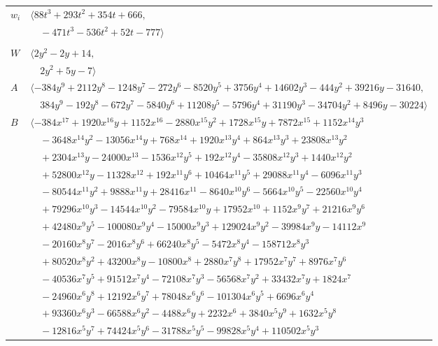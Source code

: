 \documentclass[11pt]{article}
\begin{document}
\begin{longtable}{@{}ll@{}}
$w_i$ & $\langle 88t^{3}+293t^{2}+354t+666,$\\
 & $\quad -471t^{3}-536t^{2}+52t-777\rangle$\\
\addlinespace[2pt]
\multicolumn{2}{@{}p{0.97\textwidth}@{}}{$i=32$, $D_i=2$, $\varphi_i=\tau(\Pi_{42})$, $\rho_{ij}$: $5{:}3, \allowbreak 8{:}3, \allowbreak 17{:}1, \allowbreak 21{:}2, \allowbreak 25{:}3$}\\
$W$ & $\langle 2y^{2}-2y+14,$\\
 & $\quad 2y^{2}+5y-7\rangle$\\
$A$ & $\langle -384y^{9}+2112y^{8}-1248y^{7}-272y^{6}-8520y^{5}+3756y^{4}+14602y^{3}-444y^{2}+39216y-31640,$\\
 & $\quad 384y^{9}-192y^{8}-672y^{7}-5840y^{6}+11208y^{5}-5796y^{4}+31190y^{3}-34704y^{2}+8496y-30224\rangle$\\
$B$ & $\langle -384x^{17}+1920x^{16}y+1152x^{16}-2880x^{15}y^{2}+1728x^{15}y+7872x^{15}+1152x^{14}y^{3}$\\
 & $\quad -3648x^{14}y^{2}-13056x^{14}y+768x^{14}+1920x^{13}y^{4}+864x^{13}y^{3}+23808x^{13}y^{2}$\\
 & $\quad +2304x^{13}y-24000x^{13}-1536x^{12}y^{5}+192x^{12}y^{4}-35808x^{12}y^{3}+1440x^{12}y^{2}$\\
 & $\quad +52800x^{12}y-11328x^{12}+192x^{11}y^{6}+10464x^{11}y^{5}+29088x^{11}y^{4}-6096x^{11}y^{3}$\\
 & $\quad -80544x^{11}y^{2}+9888x^{11}y+28416x^{11}-8640x^{10}y^{6}-5664x^{10}y^{5}-22560x^{10}y^{4}$\\
 & $\quad +79296x^{10}y^{3}-14544x^{10}y^{2}-79584x^{10}y+17952x^{10}+1152x^{9}y^{7}+21216x^{9}y^{6}$\\
 & $\quad +42480x^{9}y^{5}-100080x^{9}y^{4}-15000x^{9}y^{3}+129024x^{9}y^{2}-39984x^{9}y-14112x^{9}$\\
 & $\quad -20160x^{8}y^{7}-2016x^{8}y^{6}+66240x^{8}y^{5}-5472x^{8}y^{4}-158712x^{8}y^{3}$\\
 & $\quad +80520x^{8}y^{2}+43200x^{8}y-10800x^{8}+2880x^{7}y^{8}+17952x^{7}y^{7}+8976x^{7}y^{6}$\\
 & $\quad -40536x^{7}y^{5}+91512x^{7}y^{4}-72108x^{7}y^{3}-56568x^{7}y^{2}+33432x^{7}y+1824x^{7}$\\
 & $\quad -24960x^{6}y^{8}+12192x^{6}y^{7}+78048x^{6}y^{6}-101304x^{6}y^{5}+6696x^{6}y^{4}$\\
 & $\quad +93360x^{6}y^{3}-66588x^{6}y^{2}-4488x^{6}y+2232x^{6}+3840x^{5}y^{9}+1632x^{5}y^{8}$\\
 & $\quad -12816x^{5}y^{7}+74424x^{5}y^{6}-31788x^{5}y^{5}-99828x^{5}y^{4}+110502x^{5}y^{3}$\\

\end{longtable}
\end{document}

